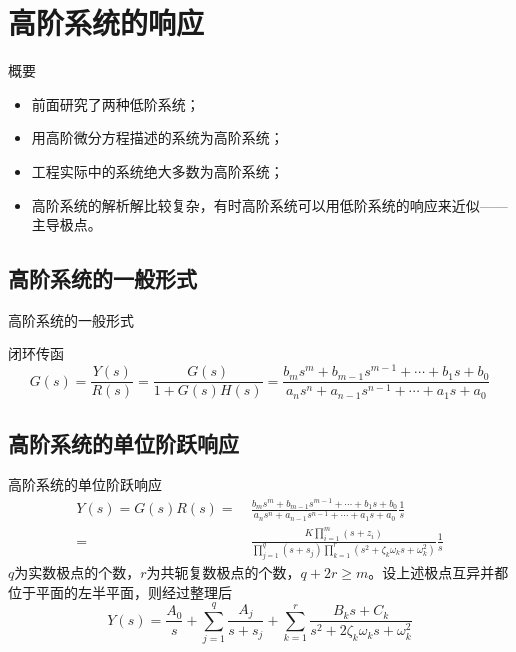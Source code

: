 \documentclass[handout,cjkutf8,table,aspectratio=1610]{beamer} %
\begin{document}
\setcounter{section}{3}
\section{高阶系统的响应}
\begin{frame}{概要}
\begin{itemize}
\item 前面研究了两种低阶系统；
\item 用高阶微分方程描述的系统为高阶系统；
\item 工程实际中的系统绝大多数为高阶系统；
\item 高阶系统的解析解比较复杂，有时高阶系统可以用低阶系统的响应来近似——主导极点。
\end{itemize}
\end{frame}

\subsection{高阶系统的一般形式}
\begin{frame}{高阶系统的一般形式}
\begin{center}
\end{center} 
\alert{闭环传函}
$$G(s)=\frac{Y(s)}{R(s)}=\frac{G(s)}{1+G(s)H(s)}=\frac{b_ms^m+b_{m-1}s^{m-1}+\cdots+b_1s+b_0}{a_ns^n+a_{n-1}s^{n-1}+\cdots+a_1s+a_0}$$
\end{frame}

\subsection{高阶系统的单位阶跃响应}
\begin{frame}{高阶系统的单位阶跃响应}
\begin{align*}
Y(s)=G(s)R(s)=&\ \frac{b_ms^m+b_{m-1}s^{m-1}+\cdots+b_1s+b_0}{a_ns^n+a_{n-1}s^{n-1}+\cdots+a_1s+a_0}\frac{1}{s}\\
=&\ \frac{K\prod_{i=1}^m(s+z_i)}{\prod_{j=1}^q(s+s_j)\prod_{k=1}^r(s^2+\zeta_k\omega_ks+\omega_k^2)}\frac{1}{s}
\end{align*}
$q$为实数极点的个数，$r$为共轭复数极点的个数，$q+2r\ge m$。设上述极点互异并都位于平面的左半平面，则经过整理后
$$Y(s)=\frac{A_0}{s}+\sum_{j=1}^q\frac{A_j}{s+s_j}+\sum_{k=1}^r\frac{B_ks+C_k}{s^2+2\zeta_k\omega_ks+\omega_k^2}$$
\end{frame}
\end{document}
